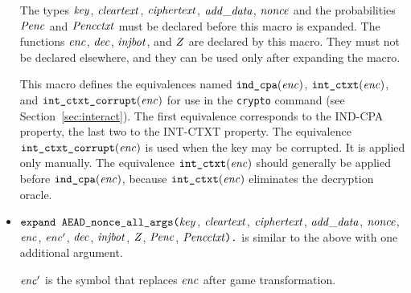 \documentclass{article}
\begin{document}
\begin{itemize}
   The types $\mathit{key}$, $\mathit{cleartext}$,
   $\mathit{ciphertext}$, $\mathit{add\_data}$, $\mathit{nonce}$ and the probabilities $\mathit{Penc}$ and $\mathit{Pencctxt}$ must
   be declared before this macro is expanded. The functions
   $\mathit{enc}$, $\mathit{dec}$, $\mathit{injbot}$, and $\mathit{Z}$ are declared by this
   macro. They must not be declared elsewhere, and they can be used
   only after expanding the macro.

   This macro defines the equivalences named $\texttt{ind\_cpa}(\mathit{enc})$,
   $\texttt{int\_ctxt}(\mathit{enc})$, and $\texttt{int\_ctxt\_corrupt}(\mathit{enc})$ 
   for use in the \texttt{crypto} command 
   (see Section~\ref{sec:interact}). 
   The first equivalence corresponds to the
   IND-CPA property, the last two to the INT-CTXT property.
   The equivalence $\texttt{int\_ctxt\_corrupt}(\mathit{enc})$ is used when the
   key may be corrupted. It is applied only manually.
   The equivalence $\texttt{int\_ctxt}(\mathit{enc})$
   should generally be applied before $\texttt{ind\_cpa}(\mathit{enc})$,
   because $\texttt{int\_ctxt}(\mathit{enc})$ eliminates the decryption oracle.

\item $\texttt{expand AEAD\_nonce\_all\_args(}\mathit{key}$,
$  \mathit{cleartext}$, $\mathit{ciphertext}$, $\mathit{add\_data}$, $\mathit{nonce}$, $\mathit{enc}$, $\mathit{enc}'$,
$  \mathit{dec}$, $\mathit{injbot}$, $\mathit{Z}$, $\mathit{Penc}$, $\mathit{Pencctxt}\texttt{).}$ is similar to the above with one additional argument.

  $\mathit{enc}'$ is the symbol that replaces $\mathit{enc}$ after game transformation.


\end{itemize}
\end{document}
